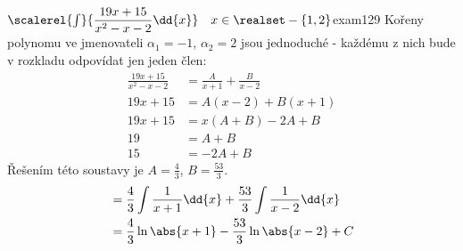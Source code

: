 \begin{mathexam}{\(\scalerel{\int}{\dfrac{19x+15}{x^2-x-2}\dd{x}} \quad x\in
  \realset-\{1,2\}\)}{exam129} 
  Kořeny polynomu ve jmenovateli $\alpha_1 = -1$, $\alpha_2 = 2$ jsou jednoduché - každému z nich
  bude v rozkladu odpovídat jen jeden člen: 
    \begin{align*}
      \frac{19x+15}{x^2-x-2}      &= \frac{A}{x+1} + \frac{B}{x-2} \\
                        19x +15   &= A(x-2) + B(x+1)               \\
                        19x +15   &= x(A+B) - 2A + B               \\
                        19        &= A + B                         \\
                             15   &=        - 2A + B
    \end{align*}              
    Řešením této soustavy je \(A = \frac{4}{3}\), \(B = \frac{53}{3}\).
    \begin{align*}
      &= \frac{4}{3}\int{\frac{1}{x+1}}\dd{x} + \frac{53}{3}\int{\frac{1}{x-2}}\dd{x}  \\
      &= \frac{4}{3}\ln\abs{x+1} - \frac{53}{3}\ln\abs{x-2} +  C
    \end{align*}   
\end{mathexam}